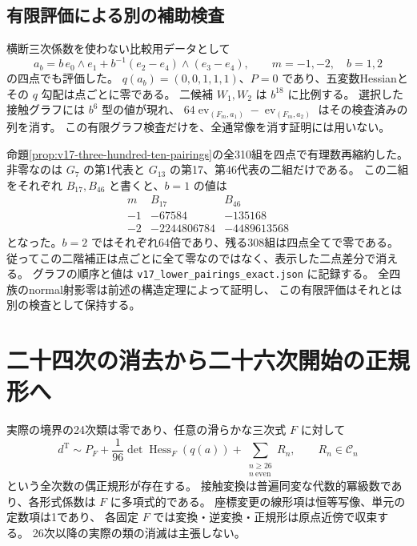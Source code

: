 \subsection{有限評価による別の補助検査}

横断三次係数を使わない比較用データとして
\[
 a_b=b\,e_0\wedge e_1+b^{-1}(e_2-e_4)\wedge(e_3-e_4),
 \qquad m=-1,-2,\quad b=1,2
\]
の四点でも評価した。
$q(a_b)=(0,0,1,1,1)$、$P=0$ であり、五変数Hessianとその $q$ 勾配は点ごとに零である。
二候補 $W_1,W_2$ は $b^{18}$ に比例する。
選択した接触グラフには $b^6$ 型の値が現れ、
$64\operatorname{ev}_{(F_m,a_1)}-\operatorname{ev}_{(F_m,a_2)}$
はその検査済みの列を消す。
この有限グラフ検査だけを、全通常像を消す証明には用いない。

命題\ref{prop:v17-three-hundred-ten-pairings}の全310組を四点で有理数再縮約した。
非零なのは $G_7$ の第1代表と $G_{13}$ の第17、第46代表の二組だけである。
この二組をそれぞれ $B_{17},B_{46}$ と書くと、$b=1$ の値は
\[
\begin{array}{c|rr}
 m&B_{17}&B_{46}\\ \hline
 -1&-67584&-135168\\
 -2&-2244806784&-4489613568
\end{array}
\]
となった。$b=2$ ではそれぞれ64倍であり、残る308組は四点全てで零である。
従ってこの二階補正は点ごとに全て零なのではなく、表示した二点差分で消える。
グラフの順序と値は \nolinkurl{v17_lower_pairings_exact.json} に記録する。
全四族のnormal射影零は前述の構造定理によって証明し、
この有限評価はそれとは別の検査として保持する。




\section{二十四次の消去から二十六次開始の正規形へ}
\label{sec:v17-twenty-sixth-normal-form}

\begin{theorem}[二十六次開始の普遍代数的収束偶正規形]
\label{thm:v17-twenty-sixth-normal-form}
実際の境界の24次類は零であり、任意の滑らかな三次式 $F$ に対して
\begin{equation}\label{eq:v17-twenty-sixth-normal-form}
 \boxed{\displaystyle
 d^{\mathrm T}\sim
 P_F+\frac1{96}\det\operatorname{Hess}_F(q(a))
      +\sum_{\substack{n\ge26\\n\ \mathrm{even}}}R_n,
 \qquad R_n\in\mathcal C_n}
\end{equation}
という全次数の偶正規形が存在する。
接触変換は普遍同変な代数的冪級数であり、各形式係数は $F$ に多項式的である。
座標変更の線形項は恒等写像、単元の定数項は1であり、
各固定 $F$ では変換・逆変換・正規形は原点近傍で収束する。
26次以降の実際の類の消滅は主張しない。
\end{theorem}

